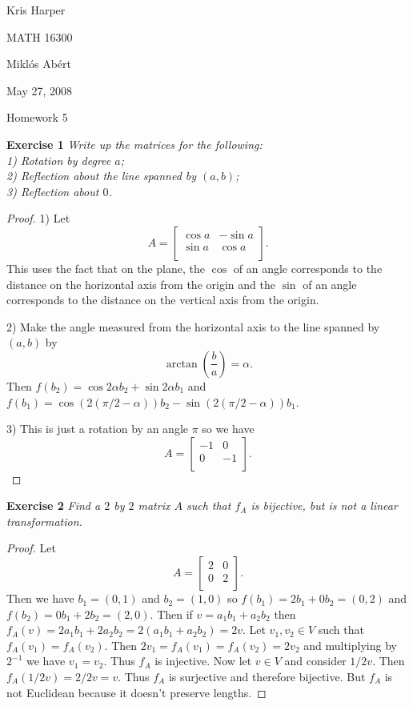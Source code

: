 \documentclass{article}
\begin{document}
\begin{flushright}
Kris Harper

MATH 16300

Mikl\'{o}s Ab\'{e}rt

May 27, 2008
\end{flushright}

\begin{center}
Homework 5
\end{center}

\begin{flushleft}

\textbf{Exercise 1}
\textsl{Write up the matrices for the following:\\
1) Rotation by degree $a$;\\
2) Reflection about the line spanned by $(a,b)$;\\
3) Reflection about $0$.}
\begin{proof}
1) Let
\[
A=
\left [
\begin{array}{cc}
\cos a & -\sin a \\
\sin a & \cos a\\
\end{array}
\right ].
\]
This uses the fact that on the plane, the $\cos$ of an angle corresponds to the distance on the horizontal axis from the origin and the $\sin$ of an angle corresponds to the distance on the vertical axis from the origin.

2)
Make the angle measured from the horizontal axis to the line spanned by $(a,b)$ by
\[
\arctan \left ( \frac{b}{a} \right ) = \alpha.
\]
Then $f(b_2) = \cos 2 \alpha b_2 + \sin 2 \alpha b_1$ and $f(b_1) = \cos ( 2 (\pi/2 - \alpha) ) b_2 - \sin (2 (\pi/2 - \alpha)) b_1$.

3)
This is just a rotation by an angle $\pi$ so we have
\[
A=
\left [
\begin{array}{cc}
-1 & 0\\
0 & -1\\
\end{array}
\right ].
\]
\end{proof}

\textbf{Exercise 2}
\textsl{Find a $2$ by $2$ matrix $A$ such that $f_A$ is bijective, but is not a linear transformation.}
\begin{proof}
Let
\[
A=
\left [
\begin{array}{cc}
2 & 0 \\
0 & 2 \\
\end{array}
\right ].
\]
Then we have $b_1 = (0,1)$ and $b_2 = (1,0)$ so $f(b_1) = 2b_1 + 0b_2 = (0,2)$ and $f(b_2) = 0b_1 + 2b_2 = (2,0)$. Then if $v = a_1b_1 + a_2b_2$ then $f_A(v) = 2a_1b_1 + 2a_2b_2 = 2(a_1b_1 + a_2b_2) = 2v$. Let $v_1, v_2 \in V$ such that $f_A(v_1) = f_A(v_2)$. Then $2v_1 = f_A(v_1) = f_A(v_2) = 2v_2$ and multiplying by $2^{-1}$ we have $v_1 = v_2$. Thus $f_A$ is injective. Now let $v \in V$ and consider $1/2 v$. Then $f_A(1/2 v) = 2/2 v = v$. Thus $f_A$ is surjective and therefore bijective. But $f_A$ is not Euclidean because it doesn't preserve lengths.
\end{proof}


\end{flushleft}
\end{document}

